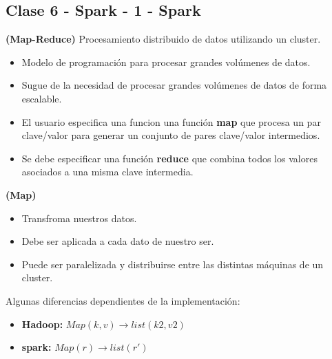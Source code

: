 \documentclass[../main.tex]{subfiles}
\begin{document}
\subsection{Clase 6 - Spark - 1 - Spark}
    \begin{definition} \textbf{(Map-Reduce)}
        Procesamiento distribuido de datos utilizando un cluster.
        \begin{itemize}
            \item Modelo de programación para procesar grandes volúmenes de datos.
            \item Sugue de la necesidad de procesar grandes volúmenes de datos de forma escalable.
        \end{itemize}

        \begin{itemize}
            \item El usuario especifica una funcion una función \textbf{map} que procesa un par clave/valor para generar un conjunto de pares clave/valor intermedios.
            \item Se debe especificar una función \textbf{reduce} que combina todos los valores asociados a una misma clave intermedia.
        \end{itemize}
    \end{definition}

    \begin{definition} \textbf{(Map)}
        \begin{itemize}
            \item Transfroma nuestros datos.
            \item Debe ser aplicada a cada dato de nuestro ser.
            \item Puede ser paralelizada y distribuirse entre las distintas máquinas de un cluster.
        \end{itemize}
        
        Algunas diferencias dependientes de la implementación:
        \begin{itemize}
            \item \textbf{Hadoop:} $Map(k,v) \rightarrow list(k2,v2)$
            \item \textbf{spark:} $Map(r) \rightarrow list(r')$
        \end{itemize}
    \end{definition}
\end{document}
